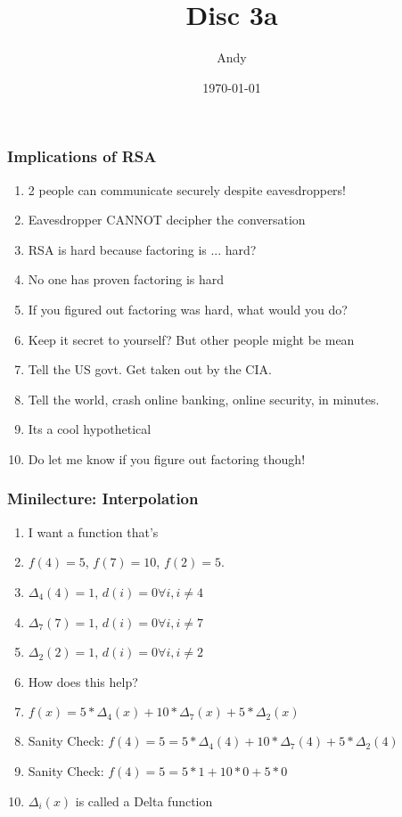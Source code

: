 \documentclass{beamer}
\title{Disc 3a}
\author{Andy}
\institute{UC Berkeley}
\date{\today}
\begin{document}
\begin{frame}
    \titlepage
\end{frame}

\begin{frame}
    \frametitle{Implications of RSA}
    
    \begin{enumerate}[<+->]
        \item 2 people can communicate securely despite eavesdroppers!
        \item Eavesdropper CANNOT decipher the conversation
        \item RSA is hard because factoring is ... hard?
        \item \alert{No one has proven factoring is hard}
        \item If you figured out factoring was hard, what would you do?
        \item Keep it secret to yourself? But other people might be mean
        \item Tell the US govt. Get taken out by the CIA.
        \item Tell the world, crash online banking, online security, in minutes.
        \item Its a cool hypothetical
        \item Do let me know if you figure out factoring though!
    \end{enumerate}

\end{frame}


\begin{frame}
    \frametitle{Minilecture: Interpolation}


    \begin{enumerate}[<+->]
        \item I want a function that's
        \item $f(4) = 5$, $f(7) = 10$, $f(2) = 5$.
        \item $\Delta_4(4) = 1$, $d(i) = 0 \forall i, i \neq 4$
        \item $\Delta_7(7) = 1$, $d(i) = 0 \forall i, i \neq 7$
        \item $\Delta_2(2) = 1$, $d(i) = 0 \forall i, i \neq 2$
        \item How does this help?
        \item $f(x) = 5*\Delta_4(x) + 10*\Delta_7(x) + 5 * \Delta_2(x)$
        \item Sanity Check: $f(4) = 5 = 5 * \Delta_4(4) + 10 * \Delta_7(4) + 5 * \Delta_2(4)$
        \item Sanity Check: $f(4) = 5 = 5 * 1 + 10 * 0 + 5 * 0$
        \item $\Delta_i(x)$ is called a Delta function
    \end{enumerate}
\end{frame}
\end{document}
